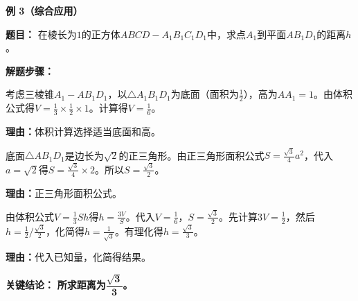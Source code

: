 \begin{examplebox}
	\medskip
	\textbf{\textcolor{CExample}{例 3（综合应用）}}

	\textbf{\textcolor{CExample}{题目：}}
	在棱长为$1$的正方体$ABCD-A_1B_1C_1D_1$中，求点$A_1$到平面$AB_1D_1$的距离$h$。

	\textbf{\textcolor{CExample}{解题步骤：}}
	\begin{description}[style=nextline, leftmargin=2.8em, labelsep=0.5em, itemsep=0.45em]
		\item[\textbf{第一步（求三棱锥体积）：}] 考虑三棱锥$A_1-AB_1D_1$，以$\triangle A_1B_1D_1$为底面（面积为$\frac12$），高为$AA_1=1$。由体积公式得$V = \frac13 \times \frac12 \times 1$。计算得$V = \frac16$。
			\par\textbf{理由：}体积计算选择适当底面和高。

		\item[\textbf{第二步（求底面面积）：}] 底面$\triangle AB_1D_1$是边长为$\sqrt{2}$的正三角形。由正三角形面积公式$S = \frac{\sqrt{3}}{4} a^2$，代入$a = \sqrt{2}$得$S = \frac{\sqrt{3}}{4} \times 2$。所以$S = \frac{\sqrt{3}}{2}$。
			\par\textbf{理由：}正三角形面积公式。

		\item[\textbf{第三步（等体积法求高）：}] 由体积公式$V=\frac13 S h$得$h = \frac{3V}{S}$。代入$V = \frac16$，$S = \frac{\sqrt{3}}{2}$。先计算$3V = \frac12$，然后$h = \frac12 \Big/ \frac{\sqrt{3}}{2}$，化简得$h = \frac{1}{\sqrt{3}}$。有理化得$h = \frac{\sqrt{3}}{3}$。
			\par\textbf{理由：}代入已知量，化简得结果。
	\end{description}

	\textbf{\textcolor{CExample}{关键结论：}}
	\textbf{所求距离为$\mathbf{\dfrac{\sqrt{3}}{3}}$。}

\end{examplebox}
